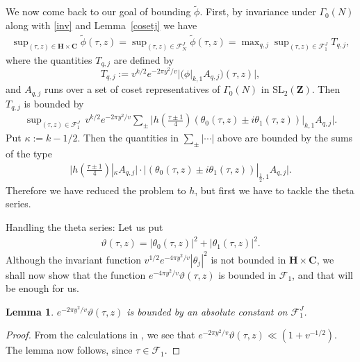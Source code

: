 \documentclass[11pt]{amsart}
\makeatletter
\numberwithin{equation}{section}
\renewcommand\subsubsection{\@secnumfont}{\bfseries}%
\renewcommand\subsubsection{\@startsection{subsubsection}{3}
  \z@{.5\linespacing\@plus.7\linespacing}{-.5em}%
  {\normalfont\bfseries}}
\theoremstyle{plain}
\newtheorem{lem}[thm]{Lemma}
\theoremstyle{definition}
\newcommand{\lemref}[1]{Lemma~\ref{#1}}
\newcommand{\C}{\mf C}
\newcommand{\h}{\mf H}
\newcommand{\mf}{\mathbf}
\newcommand{\mc}{\mathcal}
\newcommand{\mrm}{\mathrm}
\newcommand{\sumn}{\sum \nolimits}
\newcommand{\sltwo}{\mrm{SL}_2(\mf Z)}
\makeatother
\begin{document}
We now come back to our goal of bounding $\tilde{\phi}$.
First, by invariance under $\Gamma_0(N)$ along with \eqref{inv} and \lemref{cosetj} we have
\begin{align} \label{supM}
    \sup\nolimits_{(\tau,z) \in  \h \times \C}  \widetilde{\phi}(\tau,z) = \sup\nolimits_{(\tau,z) \in  \mc F^J_N}  \widetilde{\phi}(\tau,z) =  \max\nolimits_{q,j} \sup\nolimits_{(\tau,z) \in  \mc F^J_1}  T_{q,j},
\end{align}
where the quantities $T_{q,j}$ are defined by
\begin{equation}
 T_{q,j}:=   v^{k/2} e^{- 2 \pi y^2/v} | (\phi |_{k,1} A_{q,j} ) (\tau,z)|,
\end{equation}
and $A_{q,j}$ runs over a set of coset representatives of $\Gamma_0(N)$ in $\sltwo$. Then $T_{q,j}$ is bounded by
\begin{align} \label{h-th-bd1}
  \sup\nolimits_{(\tau,z) \in \mc F^J_1 } \, v^{k/2}   e^{- 2 \pi y^2/v} \sumn_\pm \big| h(\frac{\tau \pm 1}{4}) (\theta_{0}(\tau,z) \pm  i \theta_{1}(\tau,z) )|_{k,1} A_{q,j}  \big|.
\end{align}
Put $\kappa := k-1/2$. Then the quantities in $\sum_\pm | \cdots |$ above are bounded by the sums of the type
\begin{align} \label{h-th-bd2}
    \big| h(\frac{\tau \pm 1}{4}) |_{\kappa} A_{q,j} \big|\cdot \big| (\theta_{0}(\tau,z) \pm i \theta_{1}(\tau,z) )|_{\frac{1}{2},1} A_{q,j} \big|.
\end{align}
Therefore we have reduced the problem to $h$, but first we have to tackle the theta series.

\subsubsection{Handling the theta series:} Let us put 
\begin{align}
    \vartheta(\tau,z) = |\theta_{0}(\tau,z) |^2 + |\theta_{1}(\tau,z) |^2.
\end{align}
Although the invariant function $v^{1/2} e^{- 4 \pi y^2/v} |\theta_j|^2$ is not bounded in $\h \times \C$, we shall now show that the function $e^{- 4 \pi y^2/v} \vartheta(\tau,z)$ is bounded in $\mc F_1$, and that will be enough for us.

\begin{lem} \label{varth}
  $e^{- 2 \pi y^2/v} \vartheta(\tau,z)$ is bounded by an absolute constant on $\mc F_1^J$.
\end{lem}

\begin{proof}
From the calculations in \cite[Section 4.2]{PASD}, we see that $\displaystyle e^{- 2 \pi y^2/v} \vartheta(\tau,z)\ll (1+v^{-1/2})$.
The lemma now follows, since $\tau\in \mc F_1$.
\end{proof}
\end{document}
